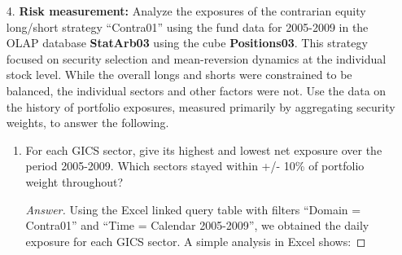 \documentclass[10pt]{article}
\begin{document}
\begin{enumerate}
\begin{enumerate}
\begin{proof}[Answer]
        The sector ``NA'' (meaning stocks that have no specific GICS sector classification) contributed the largest total return in 2006 in absolute value, with return of 19.4\%, or 7.219 in absolute value, accounting for 44.3\% of strategy total return.
        
        \medskip
        If we consider ``NA'' not as a sector and exclude it from analysis, then the Information Technology sector  contributed the largest total return in 2006 in absolute value, with return of 5.9\%, or 2.667 in absolute value, accounting for 13.5\% of strategy total return.
        
        \end{proof}   
        
        
    \end{enumerate}
    
    \item[4.] \textbf{Risk measurement:} Analyze the exposures of the contrarian equity long/short strategy ``Contra01'' using the fund data for 2005-2009 in the OLAP database \textbf{StatArb03} using the cube \textbf{Positions03}. This strategy focused on security selection and mean-reversion dynamics at the individual stock level. While the overall longs and shorts were constrained to be balanced, the individual sectors and other factors were not. Use the data on the history of portfolio exposures, measured primarily by aggregating security weights, to answer the following.
    \begin{enumerate}
        \item For each GICS sector, give its highest and lowest net exposure over the period 2005-2009. Which sectors stayed within +/- 10\% of portfolio weight throughout?
        \begin{proof}[Answer] Using the Excel linked query table with filters ``Domain = Contra01'' and ``Time = Calendar 2005-2009'', we obtained the daily exposure for each GICS sector. A simple analysis in Excel shows:
        

\end{proof}
\end{enumerate}
\end{enumerate}
\end{document}
